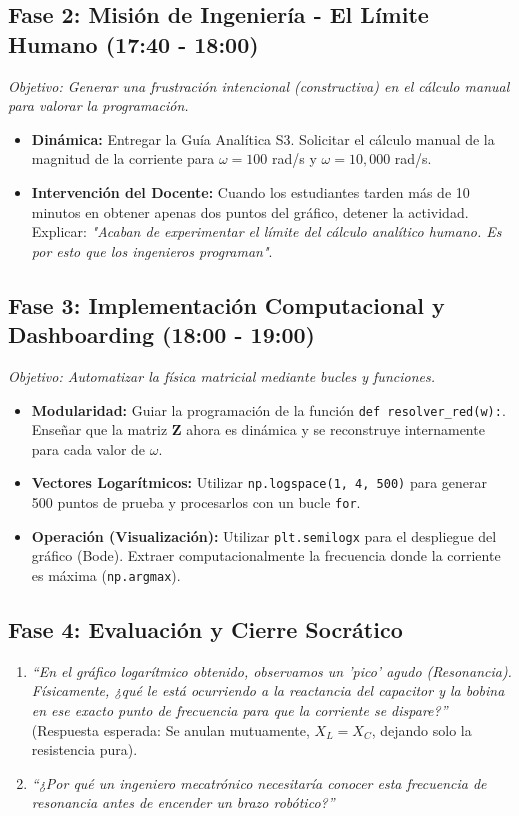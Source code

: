 \documentclass[11pt,a4paper]{article}
\begin{document}
\subsection*{Fase 2: Misión de Ingeniería - El Límite Humano (17:40 - 18:00)}
\textit{Objetivo: Generar una frustración intencional (constructiva) en el cálculo manual para valorar la programación.}
\begin{itemize}
    \item \textbf{Dinámica:} Entregar la Guía Analítica S3. Solicitar el cálculo manual de la magnitud de la corriente para $\omega = 100$ rad/s y $\omega = 10,000$ rad/s.
    \item \textbf{Intervención del Docente:} Cuando los estudiantes tarden más de 10 minutos en obtener apenas dos puntos del gráfico, detener la actividad. Explicar: \textit{"Acaban de experimentar el límite del cálculo analítico humano. Es por esto que los ingenieros programan"}.
\end{itemize}

\subsection*{Fase 3: Implementación Computacional y Dashboarding (18:00 - 19:00)}
\textit{Objetivo: Automatizar la física matricial mediante bucles y funciones.}
\begin{itemize}
    \item \textbf{Modularidad:} Guiar la programación de la función \texttt{def resolver\_red(w):}. Enseñar que la matriz $\mathbf{Z}$ ahora es dinámica y se reconstruye internamente para cada valor de $\omega$.
    \item \textbf{Vectores Logarítmicos:} Utilizar \texttt{np.logspace(1, 4, 500)} para generar 500 puntos de prueba y procesarlos con un bucle \texttt{for}.
    \item \textbf{Operación (Visualización):} Utilizar \texttt{plt.semilogx} para el despliegue del gráfico (Bode). Extraer computacionalmente la frecuencia donde la corriente es máxima (\texttt{np.argmax}).
\end{itemize}

\subsection*{Fase 4: Evaluación y Cierre Socrático}
\begin{tcolorbox}[colback=white,colframe=UCBgray,title=\textbf{Preguntas Socráticas de Cierre}]
\begin{enumerate}
    \item \textit{``En el gráfico logarítmico obtenido, observamos un 'pico' agudo (Resonancia). Físicamente, ¿qué le está ocurriendo a la reactancia del capacitor y la bobina en ese exacto punto de frecuencia para que la corriente se dispare?''} (Respuesta esperada: Se anulan mutuamente, $X_L = X_C$, dejando solo la resistencia pura).
    \item \textit{``¿Por qué un ingeniero mecatrónico necesitaría conocer esta frecuencia de resonancia antes de encender un brazo robótico?''}
\end{enumerate}
\end{tcolorbox}
\end{document}
